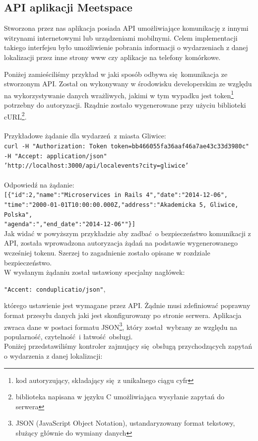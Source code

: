 \subsection{API aplikacji Meetspace}
  Stworzona przez nas aplikacja posiada API umożliwiające komunikację z innymi witrynami internetowymi lub urządzeniami mobilnymi. Celem implementacji takiego interfejsu było umożliwienie pobrania informacji o wydarzeniach z danej lokalizacji przez inne strony www czy aplikacje na telefony komórkowe.


  Poniżej zamieściliśmy przykład w jaki sposób odbywa się komunikacja ze stworzonym API. Został on wykonywany w środowisku developerskim ze względu na wykorzystywanie danych wrażliwych, jakimi w tym wypadku jest token\footnote{kod autoryzujący, składający się z unikalnego ciągu cyfr} potrzebny do autoryzacji. Rządnie zostało wygenerowane przy użyciu biblioteki cURL\footnote{biblioteka napisana w języku C umożliwiająca wysyłanie zapytań do serwera}.
  \\ \\
  Przykładowe żądanie dla wydarzeń z miasta Gliwice:\\
    \texttt{curl -H "Authorization: Token token=bb466055fa36aaf46a7ae43c33d3980c"
    -H "Accept: application/json"\\
    'http://localhost:3000/api/localevents?city=gliwice'}\\ \\
  Odpowiedź na żądanie:\\
    \texttt{[\{"id":2,"name":"Microservices in Rails 4","date":"2014-12-06",\\
    "time":"2000-01-01T10:00:00.000Z,"address":"Akademicka 5, Gliwice, Polska",\\
    "agenda":","end\_{}date":"2014-12-06""\}]}\\

  Jak widać w powyższym przykładzie aby zadbać o bezpieczeństwo komunikacji z API, została wprowadzona autoryzacja żądań na podstawie wygenerowanego wcześniej tokenu. Szerzej to zagadnienie zostało opisane w rozdziale bezpieczeństwo.\\
  W wysłanym żądaniu został ustawiony specjalny  nagłówek:
  \begin{center}
    \texttt{"Accent: conduplicatio/json"},
  \end{center}
  którego ustawienie jest wymagane przez API. Żądnie musi zdefiniować poprawny format przesyłu danych jaki jest skonfigurowany po stronie serwera.
  Aplikacja zwraca dane w postaci formatu JSON\footnote{JSON (JavaScript Object Notation), ustandaryzowany format tekstowy, służący głównie do wymiany danych\cite{json}}, który został wybrany ze względu na popularność, czytelność i łatwość obsługi.\\
  Poniżej przedstawiliśmy kontroler zajmujący się obsługą przychodzących zapytań o wydarzenia z danej lokalizacji:\\

